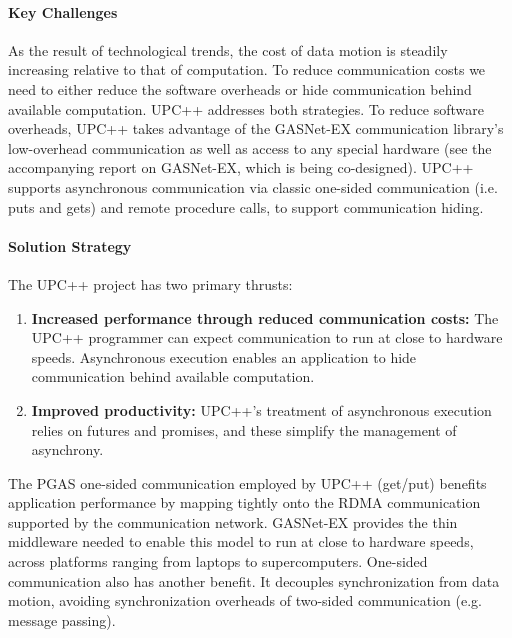 \paragraph{Key  Challenges}

As the result of technological trends, the cost of data motion is steadily increasing relative to that of computation.  To reduce communication costs we need to 
either reduce the software overheads or hide  communication behind available computation. UPC++ addresses both strategies.
To reduce software overheads, UPC++ takes advantage of the GASNet-EX communication library's \cite{gasnet-spec}
low-overhead communication as well as access to any special hardware
(see the accompanying report on GASNet-EX, which is being co-designed).
UPC++ supports asynchronous communication via classic one-sided communication
(i.e. puts and gets) and remote procedure calls, to support communication hiding.



\paragraph{Solution Strategy}

The UPC++ project has two primary thrusts:
\begin{enumerate}
\item \textbf{Increased performance through reduced communication costs:} The
UPC++ programmer can expect communication to run at close to hardware speeds.
Asynchronous execution enables an application to hide communication behind
available computation.

\item \textbf{Improved productivity:}  UPC++'s treatment of asynchronous
execution relies on futures and promises, and these simplify the management of
asynchrony.

\end{enumerate}

The PGAS one-sided communication employed by UPC++ (get/put)
benefits application  performance by mapping tightly onto the RDMA
communication supported by the communication network. GASNet-EX provides the
thin middleware
needed to enable this model to run at close to hardware speeds, across platforms ranging from laptops to supercomputers.
One-sided communication also has another benefit.
It decouples synchronization from data motion,
avoiding synchronization overheads of two-sided communication (e.g. message passing).

